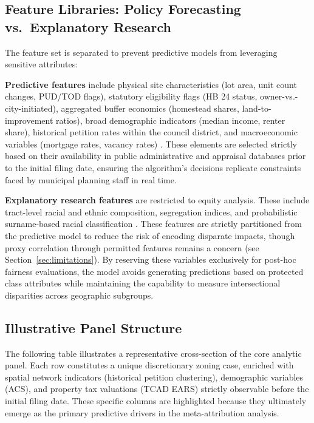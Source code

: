 \documentclass[11pt, letterpaper, oneside]{article}
\begin{document}
\subsection{Feature Libraries: Policy Forecasting vs.\ Explanatory Research}

The feature set is separated to prevent predictive models from leveraging sensitive attributes:

\textbf{Predictive features} include physical site characteristics (lot area, unit count changes, PUD/TOD flags), statutory eligibility flags (HB 24 status, owner-vs.-city-initiated), aggregated buffer economics (homestead shares, land-to-improvement ratios), broad demographic indicators (median income, renter share), historical petition rates within the council district, and macroeconomic variables (mortgage rates, vacancy rates) \cite{fredmacro}. These elements are selected strictly based on their availability in public administrative and appraisal databases prior to the initial filing date, ensuring the algorithm's decisions replicate constraints faced by municipal planning staff in real time.

\textbf{Explanatory research features} are restricted to equity analysis. These include tract-level racial and ethnic composition, segregation indices, and probabilistic surname-based racial classification \cite{sood2018ethnicolr}. These features are strictly partitioned from the predictive model to reduce the risk of encoding disparate impacts, though proxy correlation through permitted features remains a concern (see Section~\ref{sec:limitations}). By reserving these variables exclusively for post-hoc fairness evaluations, the model avoids generating predictions based on protected class attributes while maintaining the capability to measure intersectional disparities across geographic subgroups.

\subsection{Illustrative Panel Structure}
\label{sec:panel}

\noindent The following table illustrates a representative cross-section of the core analytic panel. Each row constitutes a unique discretionary zoning case, enriched with spatial network indicators (historical petition clustering), demographic variables (ACS), and property tax valuations (TCAD EARS) strictly observable before the initial filing date. These specific columns are highlighted because they ultimately emerge as the primary predictive drivers in the meta-attribution analysis.
\end{document}
